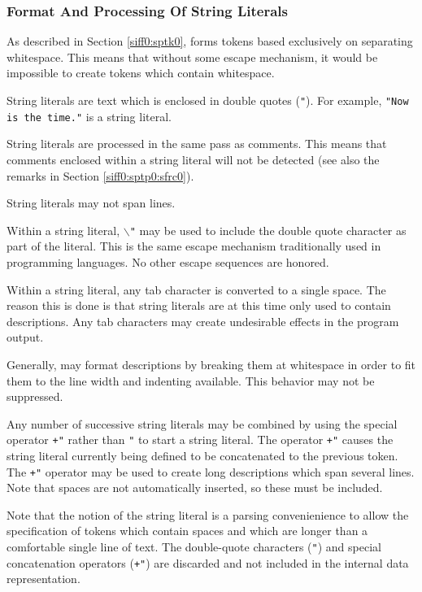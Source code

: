 \subsubsection{Format And Processing Of String Literals}
\label{siff0:sptp0:sfrs0}

As described in Section \ref{siff0:sptk0}, \swname{} forms tokens based
exclusively on separating whitespace.  This means that without some
escape mechanism, it would be impossible to create tokens which contain 
whitespace.

String literals are text which is enclosed in double quotes (\texttt{"}).
For example, \texttt{"Now is the time."} is a string literal.

String literals are processed in the same pass as comments.  This means that
comments enclosed within a string literal will not be detected (see also the remarks
in Section \ref{siff0:sptp0:sfrc0}).

String literals may not span lines.

Within a string literal, \texttt{$\backslash$"} may be used to include the double quote
character as part of the literal.  This is the same escape mechanism
traditionally used in programming languages.  No other escape sequences
are honored.

Within a string literal, any tab character is converted to a single space.  The
reason this is done is that string literals are at this time only used to
contain descriptions.  Any tab characters may create undesirable effects in the
program output.

Generally, \swname{} may format descriptions by breaking them at whitespace in
order to fit them to the line width and indenting available.  This behavior
may not be suppressed.

Any number of successive string literals may be combined by using the special operator
\texttt{+"} rather than \texttt{"} to start a string literal.  
The operator \texttt{+"} causes the string literal currently being defined to
be concatenated to the previous token.  The \texttt{+"} operator may be used
to create long descriptions which span several lines.  Note that spaces are
not automatically inserted, so these must be included.

Note that the notion of the string literal is a parsing convenienience to allow
the specification of tokens which contain spaces and which are longer than
a comfortable single line of text.  The double-quote characters (\texttt{"})
and special concatenation operators (\texttt{+"}) are discarded and not 
included in the internal data representation.

